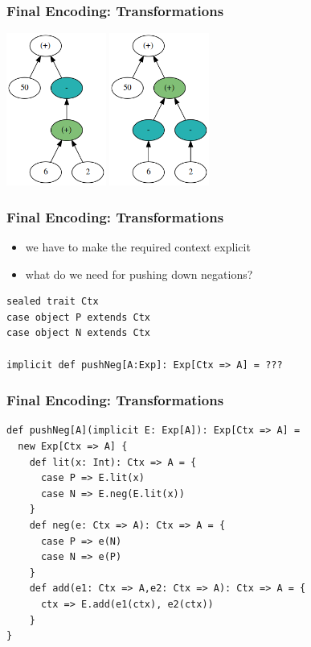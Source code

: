 \documentclass{beamer}
\begin{document}
\begin{frame}
  \frametitle{Final Encoding: Transformations}
  \begin{center}
    \includegraphics[height=5cm]{../graphs/ast-from.png}
    \hfill
    \includegraphics[height=5cm]{../graphs/ast-to.png}
  \end{center}
\end{frame}

\begin{frame}
  \frametitle{Final Encoding: Transformations}
  \begin{itemize}
  \item we have to make the required context explicit
  \item what do we need for pushing down negations?
  \end{itemize}
\begin{verbatim}
sealed trait Ctx
case object P extends Ctx
case object N extends Ctx

implicit def pushNeg[A:Exp]: Exp[Ctx => A] = ???
\end{verbatim}
\end{frame}

\begin{frame}[fragile]
  \frametitle{Final Encoding: Transformations}
\begin{verbatim}
def pushNeg[A](implicit E: Exp[A]): Exp[Ctx => A] =
  new Exp[Ctx => A] {
    def lit(x: Int): Ctx => A = {
      case P => E.lit(x)
      case N => E.neg(E.lit(x))
    }
    def neg(e: Ctx => A): Ctx => A = {
      case P => e(N)
      case N => e(P)
    }
    def add(e1: Ctx => A,e2: Ctx => A): Ctx => A = {
      ctx => E.add(e1(ctx), e2(ctx))
    }
}
\end{verbatim}

\end{frame}
\end{document}
